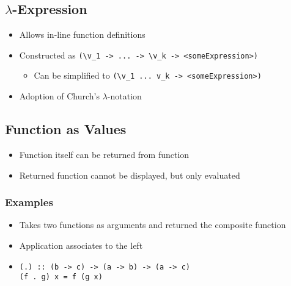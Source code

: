 \subsection{$\lambda$-Expression}
\begin{itemize}
    \item Allows in-line function definitions
    \item Constructed as \verb+(\v_1 -> ... -> \v_k -> <someExpression>)+
        \begin{itemize}
            \item Can be simplified to \verb+(\v_1 ... v_k -> <someExpression>)+
        \end{itemize}
    \item Adoption of Church's $\lambda$-notation
\end{itemize}

\subsection{Function as Values}
\begin{itemize}
    \item Function itself can be returned from function
    \item Returned function cannot be displayed, but only evaluated
\end{itemize}


\subsubsection{Examples}
\begin{itemize}
        \begin{itemize}
            \item Takes two functions as arguments and returned the composite function
            \item Application associates to the left
            \item
\begin{verbatim}
(.) :: (b -> c) -> (a -> b) -> (a -> c)
(f . g) x = f (g x)
\end{verbatim}
        \end{itemize}
\end{itemize}


